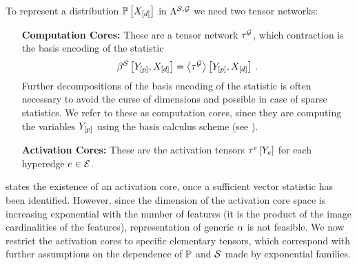 To represent a distribution $\mathbb{P}\left[X_{[d]}\right]$ in $\Lambda^{\mathcal{S},\mathcal{G}}$ we need two tensor networks:
\begin{itemize}
    \item[\textbf{Computation Cores:}] These are a tensor network $\tau^{\mathcal{G}}$, which contraction is the basis encoding of the statistic
    \begin{align*}
        \beta^{\mathcal{S}}\left[Y_{[p]},X_{[d]}\right] = \left\langle \tau^{\mathcal{G}}\right\rangle \left[ Y_{[p]},X_{[d]} \right] \, .
    \end{align*}
    Further decompositions of the basis encoding of the statistic is often necessary to avoid the curse of dimensions and possible in case of sparse statistics.
    We refer to these as computation cores, since they are computing the variables $Y_{[p]}$ using the basis calculus scheme (see ).
    \item[\textbf{Activation Cores:}] These are the activation tensors $\tau^{e}\left[Y_{e}\right]$ for each hyperedge $e\in\mathcal{E}$.
\end{itemize}


\label{sec:exponentialFamilies}

 states the existence of an activation core, once a sufficient vector statistic has been identified.
However, since the dimension of the activation core space is increasing exponential with the number of features (it is the product of the image cardinalities of the features), representation of generic $\alpha$ is not feasible.
We now restrict the activation cores to specific elementary tensors, which correspond with further assumptions on the dependence of $\mathbb{P}$ and $\mathcal{S}$ made by exponential families.


